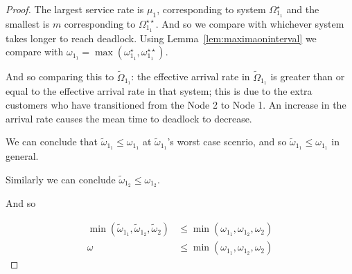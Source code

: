 \documentclass{article}
\begin{document}
\begin{proof}
The largest service rate is $\mu_1$, corresponding to system $\Omega_{1_1}^{\star}$ and the smallest is $m$ corresponding to $\Omega_{1_1}^{\star\star}$.
And so we compare with whichever system takes longer to reach deadlock. Using Lemma~\ref{lem:maximaoninterval} we compare with $\omega_{1_1} = \max(\omega_{1_1}^{\star}, \omega_{1_1}^{\star\star})$.

And so comparing this to $\widetilde{\Omega}_{1_1}$: the effective arrival rate in $\widetilde{\Omega}_{1_1}$ is greater than or equal to the effective arrival rate in that system; this is due to the extra customers who have transitioned from the Node 2 to Node 1. An increase in the arrival rate causes the mean time to deadlock to decrease.

We can conclude that $\widetilde{\omega}_{1_1} \leq \omega_{1_1}$ at $\widetilde{\omega}_{1_1}$'s worst case scenrio, and so $\widetilde{\omega}_{1_1} \leq \omega_{1_1}$ in general.

Similarly we can conclude $\widetilde{\omega}_{1_2} \leq \omega_{1_2}$.

And so

\begin{align*}
\min(\widetilde{\omega}_{1_1}, \widetilde{\omega}_{1_2}, \widetilde{\omega}_2) &\leq \min(\omega_{1_1}, \omega_{1_2}, \omega_2) \\
\omega &\leq \min(\omega_{1_1}, \omega_{1_2}, \omega_2)
\end{align*}

\end{proof}


\end{document}
